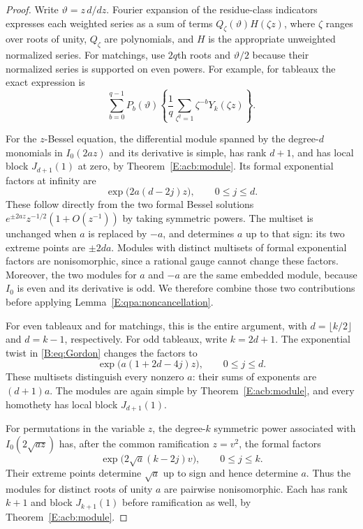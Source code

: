 \documentclass[11pt,a4paper]{article}
\theoremstyle{definition}
\theoremstyle{remark}
\numberwithin{equation}{section}
\begin{document}
\begin{proof}
Write $\vartheta=z\,d/dz$.  Fourier expansion of the residue-class
indicators expresses each weighted series as a sum of terms
$Q_\zeta(\vartheta)H(\zeta z)$, where $\zeta$ ranges over roots of
unity, $Q_\zeta$ are polynomials, and $H$ is the appropriate
unweighted normalized series.  For matchings, use $2q$th roots and
$\vartheta/2$ because their normalized series is supported on even
powers.  For example, for tableaux the exact expression is
\[
 \sum_{b=0}^{q-1}P_b(\vartheta)
       \left\{\frac1q\sum_{\zeta^q=1}\zeta^{-b}Y_k(\zeta z)\right\}.
\]

For the $z$-Bessel equation, the differential module spanned by the
degree-$d$ monomials in $I_0(2az)$ and its derivative is simple,
has rank $d+1$, and has local block $J_{d+1}(1)$ at zero, by
Theorem~\ref{E:acb:module}.  Its formal exponential factors at infinity
are
\begin{equation}\label{E:qpa:untwisted-factors}
             \exp\bigl(2a(d-2j)z\bigr),\qquad 0\le j\le d.
\end{equation}
These follow directly from the two formal Bessel solutions
$e^{\pm2az}z^{-1/2}(1+O(z^{-1}))$ by taking symmetric powers.
The multiset is unchanged when $a$ is replaced by $-a$, and determines
$a$ up to that sign: its two extreme points are $\pm2da$.
Modules with distinct multisets of formal exponential factors are
nonisomorphic, since a rational gauge cannot change these factors.
Moreover, the two modules for $a$ and $-a$ are the same embedded
module, because $I_0$ is even and its derivative is odd.  We therefore
combine those two contributions before applying
Lemma~\ref{E:qpa:noncancellation}.

For even tableaux and for matchings, this is the entire argument,
with $d=\lfloor k/2\rfloor$ and $d=k-1$, respectively.  For odd
tableaux, write $k=2d+1$.  The exponential twist in
\eqref{B:eq:Gordon} changes the factors to
\begin{equation}\label{E:qpa:twisted-factors}
             \exp\bigl(a(1+2d-4j)z\bigr),\qquad0\le j\le d.
\end{equation}
These multisets distinguish every nonzero $a$: their sums of
exponents are $(d+1)a$.  The modules are again simple by
Theorem~\ref{E:acb:module}, and every homothety has local block
$J_{d+1}(1)$.

For permutations in the variable $z$, the degree-$k$ symmetric
power associated with $I_0(2\sqrt{az})$ has, after the common
ramification $z=v^2$, the formal factors
\[
               \exp\bigl(2\sqrt a(k-2j)v\bigr),\qquad0\le j\le k.
\]
Their extreme points determine $\sqrt a$ up to sign and hence
determine $a$.  Thus the modules for distinct roots of unity $a$
are pairwise nonisomorphic.  Each has rank $k+1$ and block
$J_{k+1}(1)$ before ramification as well, by
Theorem~\ref{E:acb:module}.


\end{proof}
\end{document}
